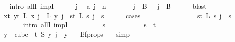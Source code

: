\begin{isabellebody}
\ \ \isamarkupfalse%
{\isacharparenleft}{\kern0pt}intro\ allI\ impI{\isacharparenright}{\kern0pt}\isanewline
\ \ \ \ \isamarkupfalse%
\ j\ \isamarkupfalse%
\ a{\isacharcolon}{\kern0pt}\ {\isachardoublequoteopen}j\ {\isacharless}{\kern0pt}\ n{\isachardoublequoteclose}\isanewline
\ \ \ \ \isamarkupfalse%
\ \isamarkupfalse%
\ {\isachardoublequoteopen}j\ {\isasymin}\ B\ {}{\isachardoublequoteclose}\ {\isacharbar}{\kern0pt}\ {\isachardoublequoteopen}j\ {\isasymin}\ B\ {}{\isachardoublequoteclose}\ \isamarkupfalse%
\ {}\ \isamarkupfalse%
\ blast\isanewline
\ \ \ \ \isamarkupfalse%
\ \isamarkupfalse%
\ {\isachardoublequoteopen}{\isacharparenleft}{\kern0pt}{\isasymforall}x{\isacharless}{\kern0pt}t{\isachardot}{\kern0pt}\ {\isasymforall}y{\isacharless}{\kern0pt}t{\isachardot}{\kern0pt}\ L\ x\ j\ {\isacharequal}{\kern0pt}\ L\ y\ j{\isacharparenright}{\kern0pt}\ {\isasymor}\ {\isacharparenleft}{\kern0pt}{\isasymforall}s{\isacharless}{\kern0pt}t{\isachardot}{\kern0pt}\ L\ s\ j\ {\isacharequal}{\kern0pt}\ s{\isacharparenright}{\kern0pt}{\isachardoublequoteclose}\isanewline
\ \ \ \ \isamarkupfalse%
\ {\isacharparenleft}{\kern0pt}cases{\isacharparenright}{\kern0pt}\isanewline
\ \ \ \ \ \ \isamarkupfalse%
\ {}\isanewline
\ \ \ \ \ \ \isamarkupfalse%
\ {\isachardoublequoteopen}{\isacharparenleft}{\kern0pt}{\isasymforall}s{\isacharless}{\kern0pt}t{\isachardot}{\kern0pt}\ L\ s\ j\ {\isacharequal}{\kern0pt}\ s{\isacharparenright}{\kern0pt}{\isachardoublequoteclose}\isanewline
\ \ \ \ \ \ \isamarkupfalse%
{\isacharparenleft}{\kern0pt}intro\ allI\ impI{\isacharparenright}{\kern0pt}\isanewline
\ \ \ \ \ \ \ \ \isamarkupfalse%
\ s\ \isanewline
\ \ \ \ \ \ \ \ \isamarkupfalse%
\ {\isachardoublequoteopen}s\ {\isacharless}{\kern0pt}\ t{\isachardoublequoteclose}\isanewline
\ \ \ \ \ \ \ \ \isamarkupfalse%
\ \isamarkupfalse%
\ {\isachardoublequoteopen}{\isasymforall}y\ {\isasymin}\ cube\ {}\ t{\isachardot}{\kern0pt}\ {\isacharparenleft}{\kern0pt}S\ y{\isacharparenright}{\kern0pt}\ j\ {\isacharequal}{\kern0pt}\ y\ {}{\isachardoublequoteclose}\ \isamarkupfalse%
\ Bf{\isacharunderscore}{\kern0pt}props\ {}\ \isamarkupfalse%
\ simp\isanewline
\ \ \ \ \ \ \ \ \isamarkupfalse%

\end{isabellebody}
